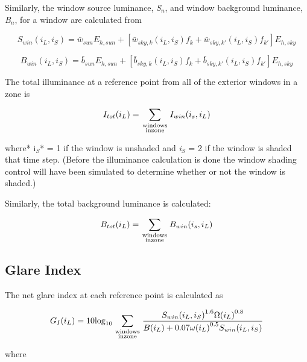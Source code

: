 Similarly, the window source luminance, \emph{S\(_{n}\)}, and window background luminance, \emph{B\(_{n}\)}, for a window are calculated from

\begin{equation}
{S_{win}}({i_L},{i_S}) = {\bar w_{sun}}{E_{h,sun}} + [{\bar w_{sky,k}}({i_L},{i_S}){f_k} + {\bar w_{sky,k'}}({i_L},{i_S}){f_{k'}}]{E_{h,sky}}
\end{equation}

\begin{equation}
{B_{win}}({i_L},{i_S}) = {\bar b_{sun}}{E_{h,sun}} + [{\bar b_{sky,k}}({i_L},{i_S}){f_k} + {\bar b_{sky,k'}}({i_L},{i_S}){f_{k'}}]{E_{h,sky}}
\end{equation}

The total illuminance at a reference point from all of the exterior windows in a zone is

\begin{equation}
{I_{tot}}({i_L}) = \sum\limits_{\scriptstyle{\rm{windows}}\atop\scriptstyle{\rm{in zone}}} {{I_{win}}({i_s},{i_L})}
\end{equation}

where* i\(_{S}\)* = 1 if the window is unshaded and \emph{i\(_{S}\)} = 2 if the window is shaded that time step. (Before the illuminance calculation is done the window shading control will have been simulated to determine whether or not the window is shaded.)

Similarly, the total background luminance is calculated:

\begin{equation}
{B_{tot}}({i_L}) = \sum\limits_{\scriptstyle{\rm{windows}}\atop\scriptstyle{\rm{in zone}}} {{B_{win}}({i_s},{i_L})}
\end{equation}

\subsection{Glare Index}\label{glare-index-000}

The net glare index at each reference point is calculated as

\begin{equation}
{G_I}({i_L}) = 10{\log_{10}}\sum\limits_{\scriptstyle{\rm{windows}}\atop\scriptstyle{\rm{in zone}}} {\frac{{{S_{win}}{{({i_L},{i_S})}^{1.6}}\Omega {{({i_L})}^{0.8}}}}{{B({i_L}) + 0.07\omega {{({i_L})}^{0.5}}{S_{win}}({i_L},{i_S})}}}
\end{equation}

where

